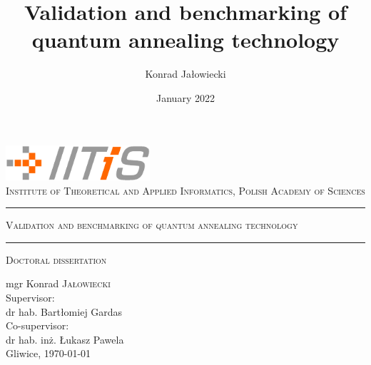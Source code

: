 \documentclass[11pt,dvipsnames]{memoir}
\title{Validation and benchmarking of quantum annealing technology}
\author{Konrad Jałowiecki}
\date{January 2022}
\theoremstyle{definition}
\begin{document}
\begin{titlingpage}
  \begin{center}
    \includegraphics[width=0.4\textwidth]{figures/iitis_logo}\\
    \vspace{0.5em}
    \textsc{\large Institute of Theoretical and Applied Informatics, Polish Academy of Sciences}
    \vspace*{1in}
    \hrule
    \vspace*{0.5em}
    \textsc{\huge Validation and benchmarking of quantum annealing technology}
    \vspace*{0.5em}
    \hrule
    \vspace*{1em}
    \textsc{\large Doctoral dissertation}
    \par
    \vspace{1.5in}
    {\large mgr Konrad \textsc{Jałowiecki}}\\
    \vspace{0.25in}
    Supervisor:\\ dr hab. Bartłomiej Gardas\\
    \vspace{0.25in}
    Co-supervisor:\\ dr hab. inż. Łukasz Pawela\\
    \vfill
    {Gliwice, \today}
  \end{center}
\end{titlingpage}

\frontmatter

\tableofcontents*
\newpage





\mainmatter











\printbibliography

\backmatter
\appendix

\end{document}

